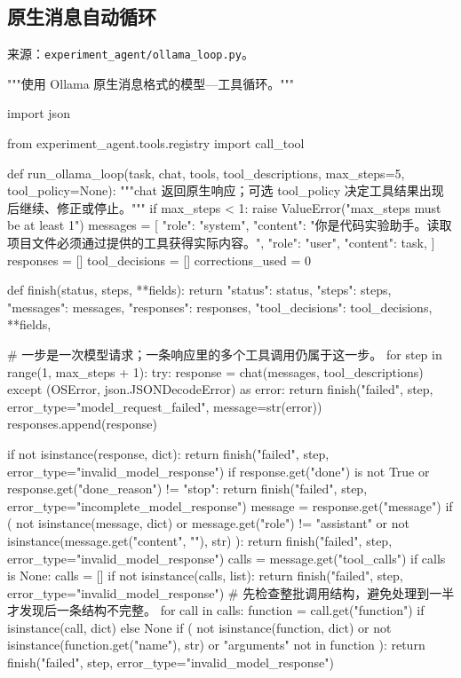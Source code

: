 \subsection{原生消息自动循环}

来源：\nolinkurl{experiment_agent/ollama_loop.py}。

\begin{Code}
"""使用 Ollama 原生消息格式的模型—工具循环。"""

import json

from experiment_agent.tools.registry import call_tool


def run_ollama_loop(task, chat, tools, tool_descriptions, max_steps=5, tool_policy=None):
    """chat 返回原生响应；可选 tool_policy 决定工具结果出现后继续、修正或停止。"""
    if max_steps < 1:
        raise ValueError("max_steps must be at least 1")
    messages = [
        {"role": "system", "content": "你是代码实验助手。读取项目文件必须通过提供的工具获得实际内容。"},
        {"role": "user", "content": task},
    ]
    responses = []
    tool_decisions = []
    corrections_used = 0

    def finish(status, steps, **fields):
        return {
            "status": status, "steps": steps, "messages": messages,
            "responses": responses, "tool_decisions": tool_decisions, **fields,
        }

    # 一步是一次模型请求；一条响应里的多个工具调用仍属于这一步。
    for step in range(1, max_steps + 1):
        try:
            response = chat(messages, tool_descriptions)
        except (OSError, json.JSONDecodeError) as error:
            return finish("failed", step, error_type="model_request_failed", message=str(error))
        responses.append(response)

        if not isinstance(response, dict):
            return finish("failed", step, error_type="invalid_model_response")
        if response.get("done") is not True or response.get("done_reason") != "stop":
            return finish("failed", step, error_type="incomplete_model_response")
        message = response.get("message")
        if (
            not isinstance(message, dict)
            or message.get("role") != "assistant"
            or not isinstance(message.get("content", ""), str)
        ):
            return finish("failed", step, error_type="invalid_model_response")
        calls = message.get("tool_calls")
        if calls is None:
            calls = []
        if not isinstance(calls, list):
            return finish("failed", step, error_type="invalid_model_response")
        # 先检查整批调用结构，避免处理到一半才发现后一条结构不完整。
        for call in calls:
            function = call.get("function") if isinstance(call, dict) else None
            if (
                not isinstance(function, dict)
                or not isinstance(function.get("name"), str)
                or "arguments" not in function
            ):
                return finish("failed", step, error_type="invalid_model_response")


\end{Code}
